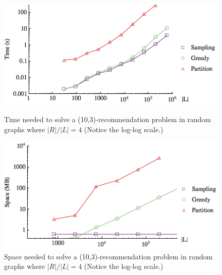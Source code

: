 \begin{figure}[t]
\centering
\begin{minipage}[h]{.48\textwidth}
\centering
\includegraphics[width=.99\textwidth]{images/time1.png}
\vspace{-0.2in}
\caption{Time needed to solve a (10,3)-recommendation problem in random graphs where $|R|/|L|=4$ (Notice the log-log scale.)}\label{fig:time_graph}
\end{minipage}
\vspace{.2cm}
\hspace{0cm}
\begin{minipage}[h]{.48\textwidth}
\centering
\includegraphics[width=.99\textwidth]{images/space.png}
\vspace{-0.2in}
\caption{Space needed to solve a (10,3)-recommendation problem in random graphs where $|R|/|L|=4$ (Notice the log-log scale.)}\label{fig:space_graph}
\end{minipage}
\vspace{-0.2in}
\end{figure}
\vs

